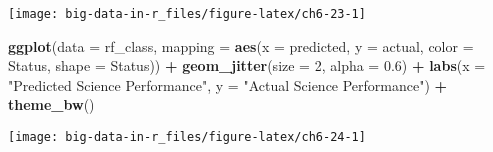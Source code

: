 \documentclass[]{book}
\newenvironment{Shaded}{\begin{snugshade}}{\end{snugshade}}
\newcommand{\DataTypeTok}[1]{\textcolor[rgb]{0.13,0.29,0.53}{#1}}
\newcommand{\DecValTok}[1]{\textcolor[rgb]{0.00,0.00,0.81}{#1}}
\newcommand{\FloatTok}[1]{\textcolor[rgb]{0.00,0.00,0.81}{#1}}
\newcommand{\KeywordTok}[1]{\textcolor[rgb]{0.13,0.29,0.53}{\textbf{#1}}}
\newcommand{\NormalTok}[1]{#1}
\newcommand{\OperatorTok}[1]{\textcolor[rgb]{0.81,0.36,0.00}{\textbf{#1}}}
\newcommand{\OtherTok}[1]{\textcolor[rgb]{0.56,0.35,0.01}{#1}}
\newcommand{\StringTok}[1]{\textcolor[rgb]{0.31,0.60,0.02}{#1}}
\begin{document}
\begin{Shaded}
\end{Shaded}

\texttt{[image: big-data-in-r\_files/figure-latex/ch6-23-1]}

\begin{Shaded}
\begin{Highlighting}[]
\KeywordTok{ggplot}\NormalTok{(}\DataTypeTok{data =}\NormalTok{ rf_class, }
       \DataTypeTok{mapping =} \KeywordTok{aes}\NormalTok{(}\DataTypeTok{x =}\NormalTok{ predicted, }\DataTypeTok{y =}\NormalTok{ actual, }
                     \DataTypeTok{color =}\NormalTok{ Status, }\DataTypeTok{shape =}\NormalTok{ Status)) }\OperatorTok{+}
\StringTok{  }\KeywordTok{geom_jitter}\NormalTok{(}\DataTypeTok{size =} \DecValTok{2}\NormalTok{, }\DataTypeTok{alpha =} \FloatTok{0.6}\NormalTok{) }\OperatorTok{+}
\StringTok{  }\KeywordTok{labs}\NormalTok{(}\DataTypeTok{x =} \StringTok{"Predicted Science Performance"}\NormalTok{,}
       \DataTypeTok{y =} \StringTok{"Actual Science Performance"}\NormalTok{) }\OperatorTok{+}
\StringTok{  }\KeywordTok{theme_bw}\NormalTok{()}
\end{Highlighting}
\end{Shaded}

\texttt{[image: big-data-in-r\_files/figure-latex/ch6-24-1]}
\end{document}
